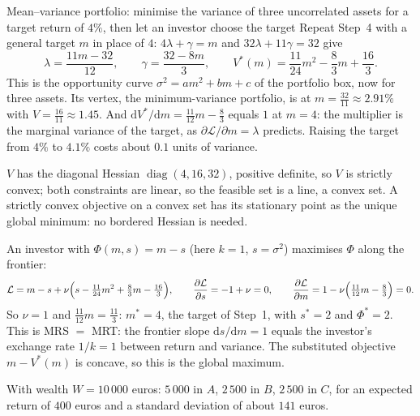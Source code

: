 \begin{worked}{Mean--variance portfolio: minimise the variance of three uncorrelated assets for a target return of $4\%$, then let an investor choose the target}
Repeat Step~4 with a general target $m$ in place of $4$:
$4\lambda+\gamma=m$ and $32\lambda+11\gamma=32$ give
\[
  \lambda=\frac{11m-32}{12},\qquad \gamma=\frac{32-8m}{3},\qquad
  V^{*}(m)=\frac{11}{24}m^{2}-\frac83m+\frac{16}{3}.
\]
This is the opportunity curve $\sigma^{2}=am^{2}+bm+c$ of the portfolio box,
now for three assets. Its vertex, the minimum-variance portfolio, is at
$m=\tfrac{32}{11}\approx2.91\%$ with $V=\tfrac{16}{11}\approx1.45$. And
$\mathrm{d}V^{*}/\mathrm{d}m=\tfrac{11}{12}m-\tfrac83$ equals $1$ at $m=4$:
the multiplier is the marginal variance of the target, as
$\partial\mathcal L/\partial m=\lambda$ predicts. Raising the target from
$4\%$ to $4.1\%$ costs about $0.1$ units of variance.

$V$ has the diagonal Hessian $\operatorname{diag}(4,16,32)$, positive
definite, so $V$ is strictly convex; both constraints are linear, so the
feasible set is a line, a convex set. A strictly convex objective on a
convex set has its stationary point as the unique global minimum: no
bordered Hessian is needed.

An investor with $\Phi(m,s)=m-s$ (here $k=1$, $s=\sigma^{2}$) maximises
$\Phi$ along the frontier:
\[
  \mathcal L=m-s+\nu\Bigl(s-\tfrac{11}{24}m^{2}+\tfrac83m-\tfrac{16}{3}\Bigr),
  \qquad
  \frac{\partial \mathcal L}{\partial s}=-1+\nu=0,\qquad
  \frac{\partial \mathcal L}{\partial m}=1-\nu\Bigl(\tfrac{11}{12}m-\tfrac83\Bigr)=0 .
\]
So $\nu=1$ and $\tfrac{11}{12}m=\tfrac{11}{3}$: $m^{*}=4$, the target of
Step~1, with $s^{*}=2$ and $\Phi^{*}=2$. This is MRS $=$ MRT: the frontier
slope $\mathrm{d}s/\mathrm{d}m=1$ equals the investor's exchange rate
$1/k=1$ between return and variance. The substituted objective
$m-V^{*}(m)$ is concave, so this is the global maximum.

With wealth $W=10\,000$ euros: $5\,000$ in $A$, $2\,500$ in $B$,
$2\,500$ in $C$, for an expected return of $400$ euros and a standard
deviation of about $141$ euros.
\end{worked}

